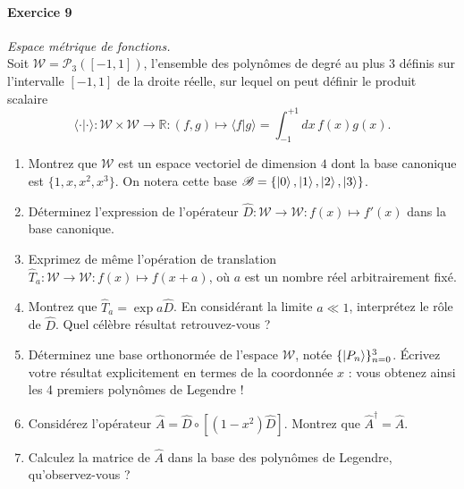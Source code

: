 \paragraph{Exercice 9} \textit{Espace métrique de fonctions.} \\
Soit $\mathcal W = \mathcal P_3([-1,1])$, l'ensemble des polynômes de degré au plus 3 définis sur l'intervalle $[-1,1]$ de la droite réelle, sur lequel on peut définir le produit scalaire
\begin{equation}
\langle \cdot|\cdot\rangle : \mathcal W \times \mathcal W\to\mathbb R : (f,g) \mapsto \langle f|g\rangle = \int_{-1}^{+1} dx\, f(x)g(x).
\end{equation}
\begin{enumerate}
\item Montrez que $\mathcal W$ est un espace vectoriel de dimension $4$ dont la base canonique est $\lbrace 1,x,x^2,x^3 \rbrace$. On notera cette base $\mathscr B = \lbrace \ket 0,\ket 1,\ket 2,\ket 3\rbrace$. 
\item Déterminez l'expression de l'opérateur $\hat D : \mathcal W\to \mathcal W : f(x) \mapsto f'(x)$ dans la base canonique.
\item Exprimez de même l'opération de translation $\hat T_a : \mathcal W \to \mathcal W : f(x) \mapsto f(x+a)$, où $a$ est un nombre réel arbitrairement fixé.
\item Montrez que $\hat T_a = \exp a \hat D$. En considérant la limite $a\ll 1$, interprétez le rôle de $\hat D$. Quel célèbre résultat retrouvez-vous ?
\item Déterminez une base orthonormée de l'espace $\mathcal W$, notée $\lbrace \ket{P_n}\rbrace_{n=0}^3$. Écrivez votre résultat explicitement en termes de la coordonnée $x$ : vous obtenez ainsi les 4 premiers polynômes de Legendre !
\item Considérez l'opérateur $\hat A = \hat D \circ [(1-x^2)\hat D]$. Montrez que $\hat A^\dagger = \hat A$.
\item Calculez la matrice de $\hat A$ dans la base des polynômes de Legendre, qu'observez-vous ?
\end{enumerate}
